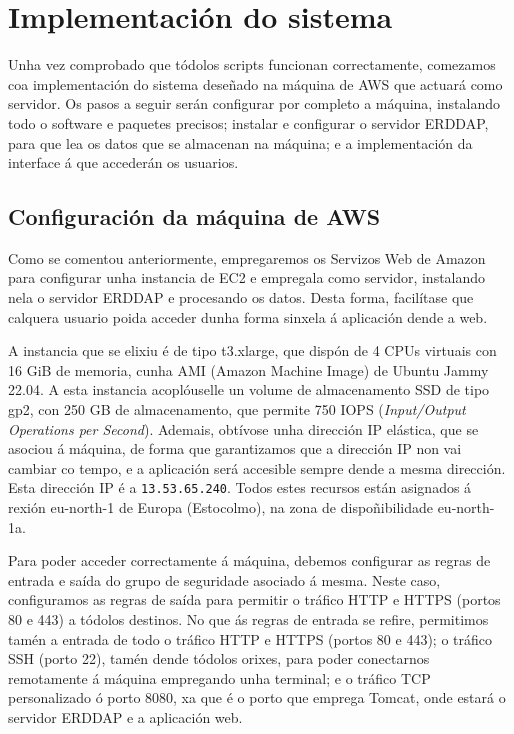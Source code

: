 \section{Implementación do sistema}\label{implementacion}
Unha vez comprobado que tódolos scripts funcionan correctamente, comezamos coa implementación do sistema deseñado na máquina de AWS que actuará como servidor. Os pasos a seguir serán configurar por
completo a máquina, instalando todo o software e paquetes precisos; instalar e configurar o servidor ERDDAP, para que lea os datos que se almacenan na máquina; e a implementación da interface á que
accederán os usuarios.

\subsection{Configuración da máquina de AWS}\label{aws}
Como se comentou anteriormente, empregaremos os Servizos Web de Amazon para configurar unha instancia de EC2 e empregala como servidor, instalando nela o servidor ERDDAP e procesando os datos.
Desta forma, facilítase que calquera usuario poida acceder dunha forma sinxela á aplicación dende a web.

A instancia que se elixiu é de tipo t3.xlarge, que dispón de 4 CPUs virtuais con 16 GiB de memoria, cunha AMI (Amazon Machine Image) de Ubuntu Jammy 22.04. A esta instancia acoplóuselle un volume de
almacenamento SSD de tipo gp2, con 250 GB de almacenamento, que permite 750 IOPS (\textit{Input/Output Operations per Second}). Ademais, obtívose unha dirección IP elástica, que se asociou á
máquina, de forma que garantizamos que a dirección IP non vai cambiar co tempo, e a aplicación será accesible sempre dende a mesma dirección. Esta dirección IP é a \texttt{13.53.65.240}. Todos estes recursos están
asignados á rexión eu-north-1 de Europa (Estocolmo), na zona de dispoñibilidade eu-north-1a.

Para poder acceder correctamente á máquina, debemos configurar as regras de entrada e saída do grupo de seguridade asociado á mesma. Neste caso, configuramos as regras de saída para permitir o tráfico
HTTP e HTTPS (portos 80 e 443) a tódolos destinos. No que ás regras de entrada se refire, permitimos tamén a entrada de todo o tráfico HTTP e HTTPS (portos 80 e 443); o tráfico SSH (porto 22), tamén
dende tódolos orixes, para poder conectarnos remotamente á máquina empregando unha terminal; e o tráfico TCP personalizado ó porto 8080, xa que é o porto que emprega Tomcat, onde estará o servidor
ERDDAP e a aplicación web.

